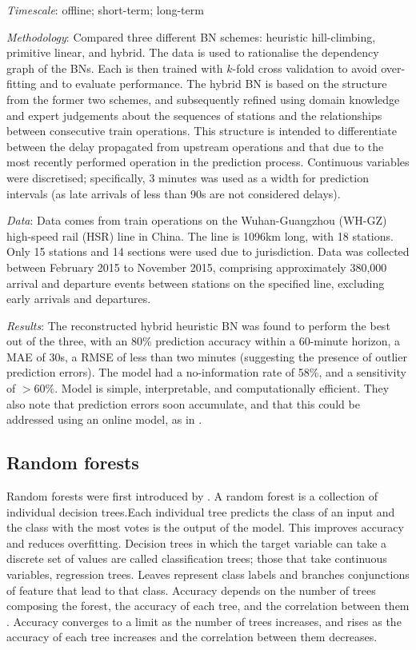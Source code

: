 \documentclass{article}
\begin{document}
\smallskip

\textit{Timescale}: offline; short-term; long-term

\smallskip

\textit{Methodology}: Compared three different BN schemes: heuristic hill-climbing, primitive linear, and hybrid. The data is used to rationalise the dependency graph of the BNs. Each is then trained with $k$-fold cross validation to avoid over-fitting and to evaluate performance. The hybrid BN is based on the structure from the former two schemes, and subsequently refined using domain knowledge and expert judgements about the sequences of stations and the relationships between consecutive train operations. This structure is intended to differentiate between the delay propagated from upstream operations and that due to the most recently performed operation in the prediction process. Continuous variables were discretised; specifically, 3 minutes was used as a width for prediction intervals (as late arrivals of less than 90s are not considered delays).

\smallskip

\textit{Data}: Data comes from train operations on the Wuhan-Guangzhou (WH-GZ) high-speed rail (HSR) line in China. The line is 1096km long, with 18 stations. Only 15 stations and 14 sections were used due to jurisdiction. Data was collected between February 2015 to November 2015, comprising approximately 380,000 arrival and departure events between stations on the specified line, excluding early arrivals and departures.

\smallskip

\textit{Results}: The reconstructed hybrid heuristic BN was found to perform the best out of the three, with an 80\% prediction accuracy within a 60-minute horizon, a MAE of 30s, a RMSE of less than two minutes (suggesting the presence of outlier prediction errors). The model had a no-information rate of 58\%, and a sensitivity of $>60\%$. Model is simple, interpretable, and computationally efficient. They also note that prediction errors soon accumulate, and that this could be addressed using an online model, as in \cite{corman_kecman_2018}.

\subsection{Random forests}
 
Random forests were first introduced by \cite{ho_1995}. A random forest is a collection of individual decision trees.Each individual tree predicts the class of an input and the class with the most votes is the output of the model. This improves accuracy and reduces overfitting. Decision trees in which the target variable can take a discrete set of values are called classification trees; those that take continuous variables, regression trees. Leaves represent class labels and branches conjunctions of feature that lead to that class. Accuracy depends on the number of trees composing the forest,  the accuracy of each tree, and the correlation between them \cite{breiman_2001}. Accuracy converges to a limit as the number of trees increases, and rises as the accuracy of each tree increases and the correlation between them decreases.
\end{document}
